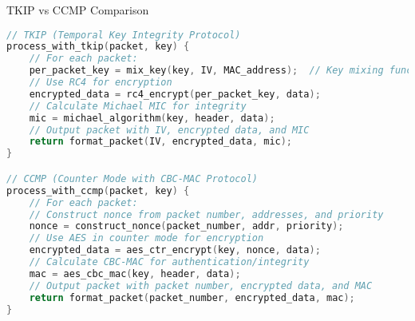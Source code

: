\begin{examplecode}{TKIP vs CCMP Comparison}\\
\begin{lstlisting}[language=C, style=basesmol]
// TKIP (Temporal Key Integrity Protocol)
process_with_tkip(packet, key) {
    // For each packet:
    per_packet_key = mix_key(key, IV, MAC_address);  // Key mixing function
    // Use RC4 for encryption
    encrypted_data = rc4_encrypt(per_packet_key, data);
    // Calculate Michael MIC for integrity
    mic = michael_algorithm(key, header, data);
    // Output packet with IV, encrypted data, and MIC
    return format_packet(IV, encrypted_data, mic);
}

// CCMP (Counter Mode with CBC-MAC Protocol)
process_with_ccmp(packet, key) {
    // For each packet:
    // Construct nonce from packet number, addresses, and priority
    nonce = construct_nonce(packet_number, addr, priority);
    // Use AES in counter mode for encryption
    encrypted_data = aes_ctr_encrypt(key, nonce, data);
    // Calculate CBC-MAC for authentication/integrity
    mac = aes_cbc_mac(key, header, data);
    // Output packet with packet number, encrypted data, and MAC
    return format_packet(packet_number, encrypted_data, mac);
}
\end{lstlisting}
\end{examplecode}